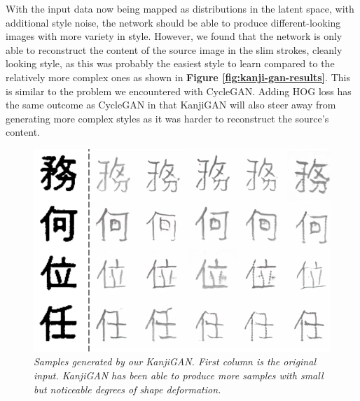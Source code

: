 \documentclass[12pt]{report}
\begin{document}
With the input data now being mapped as distributions in the latent space, with additional style noise, the network should be able to produce different-looking images with more variety in style. However, we found that the network is only able to reconstruct the content of the source image in the slim strokes, cleanly looking style, as this was probably the easiest style to learn compared to the relatively more complex ones as shown in \textbf{Figure \ref{fig:kanji-gan-results}}. This is similar to the problem we encountered with CycleGAN. Adding HOG loss has the same outcome as CycleGAN in that KanjiGAN will also steer away from generating more complex styles as it was harder to reconstruct the source's content.

\begin{figure}[H]
	\centering
	\includegraphics[scale=0.8]{kanji-gan-results-2}
	\caption{\textit{Samples generated by our KanjiGAN. First column is the original input. KanjiGAN has been able to produce more samples with small but noticeable degrees of shape deformation.}}
	\label{fig:kanji-gan-results-2}
\end{figure}
\end{document}

